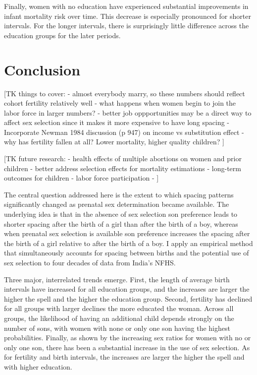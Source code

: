 \documentclass[12pt,letterpaper]{article}
\begin{document}
Finally, women with no education have experienced substantial improvements
in infant mortality risk over time.
This decrease is especially pronounced for shorter intervals.
For the longer intervals, there is surprisingly little difference across
the education groups for the later periods.



\section{Conclusion\label{sec:conclusion}}

[TK things to cover:
- almost everybody marry, so these numbers should reflect cohort fertility relatively well
- what happens when women begin to join the labor force in larger numbers?
- better job oppportunities may be a direct way to affect sex selection since it makes 
it more expensive to have long spacing
- Incorporate Newman 1984 discussion (p 947) on income vs substitution effect
- why has fertility fallen at all? Lower mortality, higher quality children?
]

[TK future research:
- health effects of multiple abortions on women and prior children
- better address selection effects for mortality estimations
- long-term outcomes for children
- labor force participation
- ]

The central question addressed here is the extent to which spacing patterns significantly 
changed as prenatal sex determination became available.
The underlying idea is that in the absence of sex selection son preference leads to shorter 
spacing after the birth of a girl than after the birth of a boy, whereas when prenatal sex 
selection is available son preference increases the spacing after the birth of a girl 
relative to after the birth of a boy.
I apply an empirical method that simultaneously accounts for spacing between births 
and the potential use of sex selection to four decades of data from India's NFHS.

Three major, interrelated trends emerge.
First, 
the length of average birth intervals have increased for all education groups, and
the increases are larger the higher the spell and the higher the education group.
Second, fertility has declined for all groups with larger declines the more educated the 
woman.
Across all groups, the likelihood of having an additional child depends strongly on the 
number of sons, with women with none or only one son having the highest probabilities.
Finally, as shown by the increasing sex ratios for women with no or only one son, there
has been a substantial increase in the use of sex selection.
As for fertility and birth intervals, the increases are larger the higher the spell and
with higher education.
\end{document}
